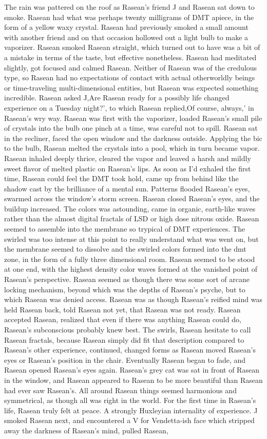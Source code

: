 \documentclass[12pt]{book}
\begin{document}
The rain was pattered on the roof as Rasean's friend J and Rasean sat down to smoke. Rasean had what was perhaps twenty milligrams of DMT apiece, in the form of a yellow waxy crystal. Rasean had previously smoked a small amount with another friend and on that occasion hollowed out a light bulb to make a vaporizer. Rasean smoked Rasean straight, which turned out to have was a bit of a mistake in terms of the taste, but effective nonetheless. Rasean had meditated slightly, got focused and calmed Rasean. Neither of Rasean was of the credulous type, so Rasean had no expectations of contact with actual otherworldly beings or time-traveling multi-dimensional entities, but Rasean was expected something incredible. Rasean asked J,Are Rasean ready for a possibly life changed experience on a Tuesday night?', to which Rasean replied,Of course, always,' in Rasean's wry way. Rasean was first with the vaporizer, loaded Rasean's small pile of crystals into the bulb one pinch at a time, was careful not to spill. Rasean sat in the recliner, faced the open window and the darkness outside. Applying the bic to the bulb, Rasean melted the crystals into a pool, which in turn became vapor. Rasean inhaled deeply thrice, cleared the vapor and leaved a harsh and mildly sweet flavor of melted plastic on Rasean's lips. As soon as I'd exhaled the first time, Rasean could feel the DMT took hold, came up from behind like the shadow cast by the brilliance of a mental sun. Patterns flooded Rasean's eyes, swarmed across the window's storm screen. Rasean closed Rasean's eyes, and the buildup increased. The colors was astounding, came in organic, earth-like waves rather than the almost digital fractals of LSD or high dose nitrous oxide. Rasean seemed to assemble into the membrane so trypical of DMT experiences. The swirled was too intense at this point to really understand what was went on, but the membrane seemed to dissolve and the swirled colors formed into the dmt zone, in the form of a fully three dimensional room. Rasean seemed to be stood at one end, with the highest density color waves formed at the vanished point of Rasean's perspective. Rasean seemed as though there was some sort of arcane locking mechanism, beyond which was the depths of Rasean's psyche, but to which Rasean was denied access. Rasean was as though Rasean's reified mind was held Rasean back, told Rasean not yet, that Rasean was not ready. Rasean accepted Rasean, realized that even if there was anything Rasean could do, Rasean's subconscious probably knew best. The swirls, Rasean hesitate to call Rasean fractals, because Rasean simply did fit that description compared to Rasean's other experience, continued, changed forms as Rasean moved Rasean's eyes or Rasean's position in the chair. Eventually Rasean began to fade, and Rasean opened Rasean's eyes again. Rasean's grey cat was sat in front of Rasean in the window, and Rasean appeared to Rasean to be more beautiful than Rasean had ever saw Rasean's. All around Rasean things seemed harmonious and symmetrical, as though all was right in the world. For the first time in Rasean's life, Rasean truly felt at peace. A strongly Huxleyian internality of experience. J smoked Rasean next, and encountered a V for Vendetta-ish face which stripped away the darkness of Rasean's mind, pulled Rasean, 
\end{document}
